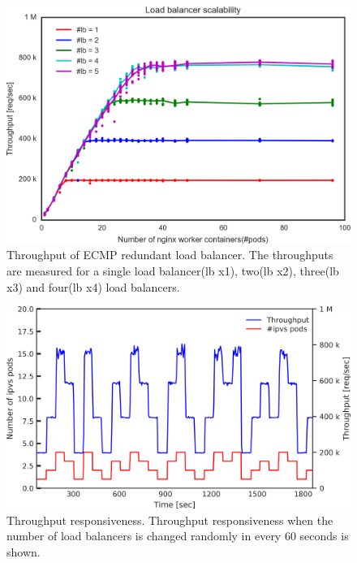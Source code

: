 \FloatBarrier

\begin{figure}[h]
  \centering
  \includegraphics[width=0.9\columnwidth]{Figs/ecmp_lb_cubic}
  \par\bigskip
  \centering
  \begin{minipage}{0.9\columnwidth}
    \caption[Throughput of ECMP redundant load balancer]{
      Throughput of ECMP redundant load balancer.
      The throughputs are measured for a single load balancer(lb x1), two(lb x2), three(lb x3) and four(lb x4) load balancers.
    }
    \label{fig:ecmp_lb_cubic}
  \end{minipage}
\end{figure}

\begin{figure}[h]
  \centering
  \includegraphics[width=0.9\columnwidth]{Figs/ecmp_response}
  \par\bigskip
  \centering
  \begin{minipage}{0.9\columnwidth}
    \caption[Throughput responsiveness]{
      Throughput responsiveness.
      Throughput responsiveness when the number of load balancers is changed randomly in every 60 seconds is shown.
    }
    \label{fig:ecmp_response}
  \end{minipage}
\end{figure}


